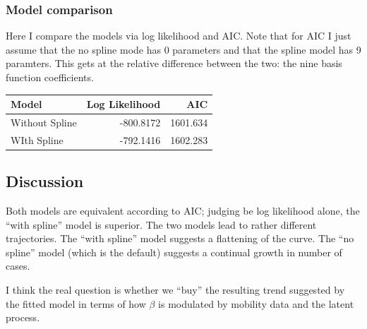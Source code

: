 \documentclass[]{article}
\begin{document}
\hypertarget{model-comparison}{%
\subsubsection{Model comparison}\label{model-comparison}}

Here I compare the models via log likelihood and AIC. Note that for AIC
I just assume that the no spline mode has 0 parameters and that the
spline model has 9 paramters. This gets at the relative difference
between the two: the nine basis function coefficients.

\begin{longtable}[]{@{}lrr@{}}
\toprule
Model & Log Likelihood & AIC\tabularnewline
\midrule
\endhead
Without Spline & -800.8172 & 1601.634\tabularnewline
WIth Spline & -792.1416 & 1602.283\tabularnewline
\bottomrule
\end{longtable}

\hypertarget{discussion}{%
\subsection{Discussion}\label{discussion}}

Both models are equivalent according to AIC; judging be log likelihood
alone, the ``with spline'' model is superior. The two models lead to
rather different trajectories. The ``with spline'' model suggests a
flattening of the curve. The ``no spline'' model (which is the default)
suggests a continual growth in number of cases.

I think the real question is whether we ``buy'' the resulting trend
suggested by the fitted model in terms of how \(\beta\) is modulated by
mobility data and the latent process.
\end{document}
